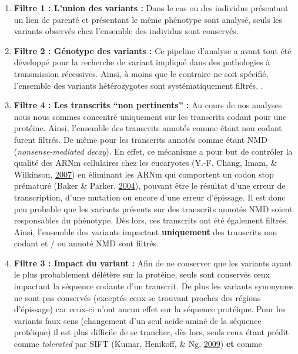 \documentclass[12pt,twoside]{reedthesis}
\theoremstyle{definition}
\theoremstyle{definition}
\theoremstyle{remark}
\begin{document}
  \begin{enumerate}
  \def\labelenumi{\arabic{enumi}.}
  \item
    \textbf{Filtre 1 : L'union des variants :} Dans le cas ou des
    individus présentant un lien de parenté et présentant le même
    phénotype sont analysé, seuls les variants observés chez l'ensemble
    des individus sont conservés.
  \item
    \textbf{Filtre 2 : Génotype des variants :} Ce pipeline d'analyse a
    avant tout été développé pour la recherche de variant impliqué dans
    des pathologies à transmission récessives. Ainsi, à moins que le
    contraire ne soit spécifié, l'ensemble des variants hétérozygotes sont
    systématiquement filtrés. .
  \item
    \textbf{Filtre 4 : Les transcrits ``non pertinents'' :} Au cours de
    nos analyses nous nous sommes concentré uniquement sur les transcrits
    codant pour une protéine. Ainsi, l'ensemble des transcrits annotés
    comme étant non codant furent filtrés. De même pour les transcrits
    annotés comme étant NMD (\emph{nonsense-mediated decay}). En effet, ce
    mécanisme a pour but de contrôler la qualité des ARNm cellulaires chez
    les eucaryotes (Y.-F. Chang, Imam, \& Wilkinson,
    \protect\hyperlink{ref-Chang2007}{2007}) en éliminant les ARNm qui
    comportent un codon stop prématuré (Baker \& Parker,
    \protect\hyperlink{ref-Baker2004}{2004}), pouvant être le résultat
    d'une erreur de transcription, d'une mutation ou encore d'une erreur
    d'épissage. Il est donc peu probable que les variants présents sur des
    transcrits annotés NMD soient responsables du phénotype. Dès lors, ces
    transcrits ont été également filtrés. Ainsi, l'ensemble des variants
    impactant \textbf{uniquement} des transcrits non codant et / ou annoté
    NMD sont filtrés.
  \item
    \textbf{Filtre 3 : Impact du variant :} Afin de ne conserver que les
    variants ayant le plus probablement délétère sur la protéine, seuls
    sont conservés ceux impactant la séquence codante d'un transcrit. De
    plus les variants synonymes ne sont pas conservés (exceptés ceux se
    trouvant proches des régions d'épissage) car ceux-ci n'ont aucun effet
    sur la séquence protéique. Pour les variants faux sens (changement
    d'un seul acide-aminé de la séquence protéique) il est plus difficile
    de se trancher, dès lors, seuls ceux étant prédit comme
    \emph{tolerated} par SIFT (Kumar, Henikoff, \& Ng,
    \protect\hyperlink{ref-Kumar2009}{2009}) \textbf{et} comme

\end{enumerate}
\end{document}
